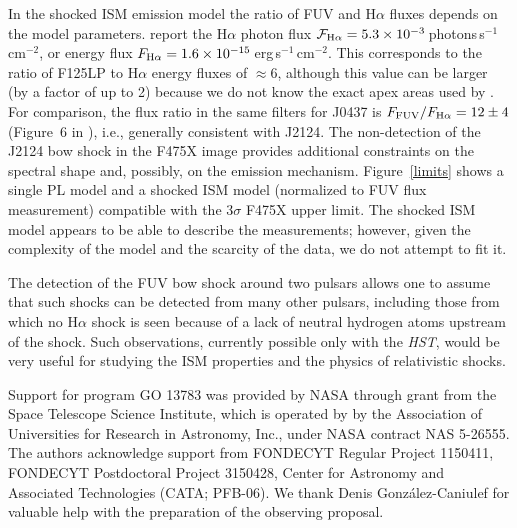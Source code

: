 \documentclass[iop]{emulateapj}
\begin{document}
In the shocked ISM emission model the ratio of FUV and H$\alpha$ fluxes depends on the model parameters. \citet{2014ApJ...784..154B} report the H$\alpha$ photon flux $\mathcal{F}_{\rm H\alpha}=5.3\times10^{-3}$\,photons\,s$^{-1}$\,cm$^{-2}$, or energy flux $F_{\rm H\alpha} = 1.6\times10^{-15}$\,erg\,s$^{-1}$\,cm$^{-2}$. This corresponds to the  ratio of F125LP to H$\alpha$ energy fluxes of $\approx6$, although this value can be larger (by a factor of up to 2) because we do not know the exact apex areas used by \citet{2014ApJ...784..154B}. For comparison, the flux ratio  in the same filters for J0437 is $F_{\rm FUV}/F_{\rm H\alpha}=12\pm 4$ (Figure~6 in \citealt{2016ApJ...831..129R}), i.e., generally consistent with
J2124. The non-detection of the J2124 bow shock in the F475X image provides additional constraints on the spectral shape and, possibly, on the emission mechanism. Figure~\ref{limits} shows a single PL model and a shocked ISM model (normalized to FUV flux measurement) compatible with the $3\sigma$ F475X upper limit. The shocked ISM model appears to be able to describe the measurements;
 however, given the complexity of the model and the scarcity of the data, we do not attempt to fit it. 

The detection of the FUV bow shock around two pulsars allows one to assume that such shocks can be detected from many other pulsars, including those from which no H$\alpha$ shock is seen because of a lack of neutral hydrogen atoms upstream of the shock. Such observations, currently possible only with the {\sl HST}, would be very useful for studying the ISM properties and the physics of relativistic shocks.

\acknowledgements
Support for program GO 13783 was provided by NASA through grant from the Space Telescope Science Institute, which is operated by by the Association of Universities for Research in Astronomy, Inc., under NASA contract NAS 5-26555. The authors acknowledge support from FONDECYT Regular Project 1150411, FONDECYT Postdoctoral Project 3150428, Center for Astronomy and Associated Technologies (CATA; PFB-06). We thank Denis Gonz\'alez-Caniulef for valuable help with the preparation of the observing proposal.

\end{document}
